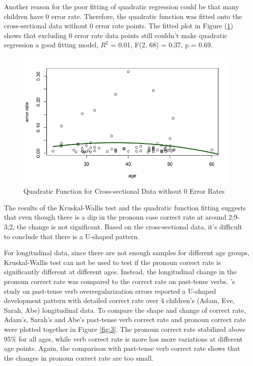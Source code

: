 \FloatBarrier
Another reason for the poor fitting of quadratic regression could be that many children have 0 error rate. Therefore, the quadratic function was fitted onto the cross-sectional data without 0 error rate points. The fitted plot in Figure (\ref{poly3}) shows that excluding 0 error rate data points still couldn't make quadratic regression a good fitting model, $R^2$ = 0.01, F(2, 68) = 0.37, p = 0.69.
\FloatBarrier
\begin{figure}[h]
    \centering
    \includegraphics[scale = 0.5]{graph/polynomial3.png}
    \vspace{-1em}
    \caption{Quadratic Function for Cross-sectional Data without 0 Error Rates}
    \label{poly3}
\end{figure}
\FloatBarrier
The results of the Kruskal-Wallis test and the quadratic function fitting suggests that even though there is a dip in the pronoun case correct rate at around 2;9-3;2, the change is not significant. Based on the cross-sectional data, it's difficult to conclude that there is a U-shaped pattern. 


For longitudinal data, since there are not enough samples for different age groups,  Kruskal-Wallis test can not be used to test if the pronoun correct rate is significantly different at different ages. Instead, the longitudinal change in the pronoun correct rate was compared to the correct rate on past-tense verbs. \cite{marcus1992overregularization}'s study on past-tense verb overregularization errors reported a U-shaped development pattern with detailed correct rate over 4 children's (Adam, Eve, Sarah, Abe) longitudinal data. To compare the shape and change of correct rate, Adam's, Sarah's and Abe's past-tense verb correct rate and pronoun correct rate were plotted together in Figure \ref{fig:3}. The pronoun correct rate stabilized above 95\% for all ages, while verb correct rate is more has more variations at different age points. Again, the comparison with past-tense verb correct rate shows that the changes in pronoun correct rate are too small.  

